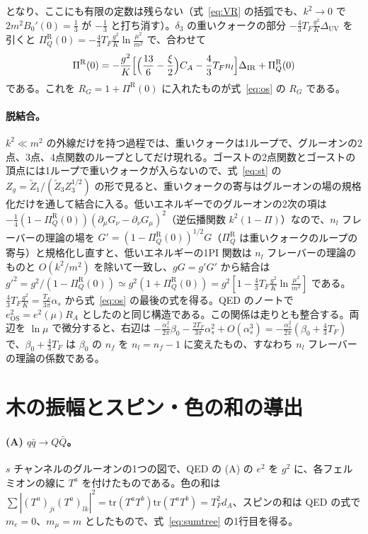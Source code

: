 \documentclass[a4paper,10pt]{ltjsarticle}
\newcommand{\DUV}{\Delta_{\mathrm{UV}}}
\newcommand{\DIR}{\Delta_{\mathrm{IR}}}
\newcommand{\tr}{\mathrm{tr}}
\begin{document}
となり、ここにも有限の定数は残らない（式~\eqref{eq:VR} の括弧でも、$k^2\to0$ で $2m^2B_0'(0)=\frac13$ が $-\frac13$ と打ち消す）。$\delta_3$ の重いクォークの部分 $-\frac43T_F\frac{g^2}K\DUV$ を引くと $\Pi_Q^{\mathrm R}(0)=-\frac43T_F\frac{g^2}K\ln\frac{\mu^2}{m^2}$ で、合わせて
\begin{equation*}
\Pi^{\mathrm R}(0)=-\frac{g^2}K\Bigl[\Bigl(\frac{13}6-\frac\xi2\Bigr)C_A-\frac43T_Fn_l\Bigr]\DIR+\Pi_Q^{\mathrm R}(0)
\end{equation*}
である。これを $R_G=1+\Pi^{\mathrm R}(0)$ に入れたものが式~\eqref{eq:os} の $R_G$ である。

\paragraph{脱結合。}$k^2\ll m^2$ の外線だけを持つ過程では、重いクォークは1ループで、グルーオンの2点、3点、4点関数のループとしてだけ現れる。ゴーストの2点関数とゴーストの頂点には1ループで重いクォークが入らないので、式~\eqref{eq:st} の $Z_g=\tilde Z_1/(\tilde Z_3Z_3^{1/2})$ の形で見ると、重いクォークの寄与はグルーオンの場の規格化だけを通して結合に入る。低いエネルギーでのグルーオンの2次の項は $-\frac14(1-\Pi_Q^{\mathrm R}(0))(\partial_\mu G_\nu-\partial_\nu G_\mu)^2$（逆伝播関数 $k^2(1-\Pi)$）なので、$n_l$ フレーバーの理論の場を $G'=(1-\Pi_Q^{\mathrm R}(0))^{1/2}G$（$\Pi_Q^{\mathrm R}$ は重いクォークのループの寄与）と規格化し直すと、低いエネルギーの1PI 関数は $n_l$ フレーバーの理論のものと $O(k^2/m^2)$ を除いて一致し、$gG=g'G'$ から結合は $g'^2=g^2/(1-\Pi_Q^{\mathrm R}(0))\simeq g^2(1+\Pi_Q^{\mathrm R}(0))=g^2[1-\frac43T_F\frac{g^2}K\ln\frac{\mu^2}{m^2}]$ である。$\frac43T_F\frac{g^2}K=\frac{T_F}{3\pi}\alpha_s$ から式~\eqref{eq:os} の最後の式を得る。QED のノートで $e_{\mathrm{OS}}^2=e^2(\mu)R_A$ としたのと同じ構造である。この関係は走りとも整合する。両辺を $\ln\mu$ で微分すると、右辺は $-\frac{\alpha_s^2}{2\pi}\beta_0-\frac{2T_F}{3\pi}\alpha_s^2+O(\alpha_s^3)=-\frac{\alpha_s^2}{2\pi}(\beta_0+\frac43T_F)$ で、$\beta_0+\frac43T_F$ は $\beta_0$ の $n_f$ を $n_l=n_f-1$ に変えたもの、すなわち $n_l$ フレーバーの理論の係数である。

\section{木の振幅とスピン・色の和の導出}\label{app:tree}

\paragraph{(A) $q\bar q\to Q\bar Q$。}$s$ チャンネルのグルーオンの1つの図で、QED の (A) の $e^2$ を $g^2$ に、各フェルミオンの線に $T^a$ を付けたものである。色の和は $\sum|(T^a)_{ji}(T^a)_{lk}|^2=\tr(T^aT^b)\tr(T^aT^b)=T_F^2d_A$、スピンの和は QED の式で $m_e=0$、$m_\mu=m$ としたもので、式~\eqref{eq:sumtree} の1行目を得る。
\end{document}
